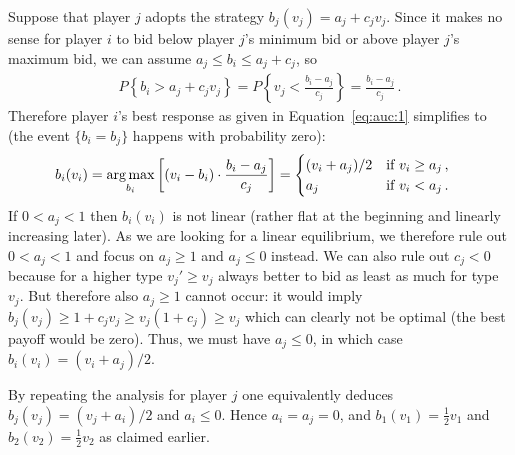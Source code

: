 Suppose that player $j$ adopts the strategy $b_j(v_j) = a_j + c_jv_j$. Since it makes no sense for player $i$ to bid below player $j$'s minimum bid or above player $j$'s maximum bid, we can assume $a_j \leq b_i \leq a_j + c_j$, so
\begin{align}
 P \left\{b_i > a_j + c_j v_j\right\} = P \left\{v_j < \frac{b_i - a_j}{c_j} \right\} = \frac{b_i - a_j}{c_j}\,.
\end{align}
Therefore player $i$'s best response as given in Equation~\eqref{eq:auc:1} simplifies to (the event $\{b_i = b_j\}$ happens with probability zero):
\begin{align}
b_i(v_i) &=  \operatorname*{arg\,max}_{b_i}  \left[\left(v_i - b_i\right) \cdot \frac{b_i-a_j}{c_j}\right] = \begin{cases}
 (v_i + a_j)/2 &\text{if } v_i \geq a_j\,,\\
 a_j & \text{if } v_i < a_j\,.
\end{cases}
\end{align}
If $0 < a_j < 1$ then $b_i(v_i)$ is not linear (rather flat at the beginning and linearly increasing later). As we are looking for a linear equilibrium, we therefore rule out $0 < a_j < 1$ and focus on $a_j \geq 1$ and $a_j \leq 0$ instead. We can also rule out $c_j < 0$ because for a higher type $v_j' \geq v_j$ always better to bid as least as much for type $v_j$. But therefore also $a_j \geq 1$ cannot occur: it would imply $b_j(v_j) \geq 1 + c_j v_j \geq v_j (1+c_j) \geq v_j$ which can clearly not be optimal (the best payoff would be zero). Thus, we must have $a_j \leq 0$, in which case $b_i(v_i) = (v_i + a_j)/2$.

By repeating the analysis for player $j$ one equivalently deduces $b_j(v_j)=(v_j+a_i)/2$ and $a_i \leq 0$. Hence $a_i=a_j=0$, and $b_1(v_1)=\frac{1}{2}v_1$ and $b_2(v_2)=\frac{1}{2}v_2$ as claimed earlier.





